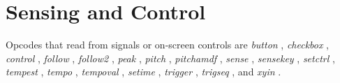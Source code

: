 \begin{comment}
\documentclass[10pt]{article}
\usepackage{fullpage, graphicx, url}
\setlength{\parskip}{1ex}
\setlength{\parindent}{0ex}
\title{Sensing and Control}



\begin{tabular}{ccc}
The Alternative Csound Reference Manual & & \\
Previous &Instrument Control &Next

\end{tabular}

\end{comment}
\section{Sensing and Control}


  Opcodes that read from signals or on-screen controls are \emph{button}
, \emph{checkbox}
, \emph{control}
, \emph{follow}
, \emph{follow2}
, \emph{peak}
, \emph{pitch}
, \emph{pitchamdf}
, \emph{sense}
, \emph{sensekey}
, \emph{setctrl}
, \emph{tempest}
, \emph{tempo}
, \emph{tempoval}
, \emph{setime}
, \emph{trigger}
, \emph{trigseq}
, and \emph{xyin}
. 


\begin{comment}
\begin{tabular}{lcr}
Previous &Home &Next \\
Reinitialization &Up &Sub-instrument Control

\end{tabular}



\end{comment}
